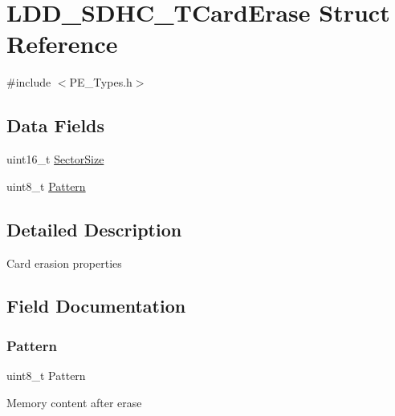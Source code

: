 \hypertarget{struct_l_d_d___s_d_h_c___t_card_erase}{}\section{L\+D\+D\+\_\+\+S\+D\+H\+C\+\_\+\+T\+Card\+Erase Struct Reference}
\label{struct_l_d_d___s_d_h_c___t_card_erase}


{\ttfamily \#include $<$P\+E\+\_\+\+Types.\+h$>$}

\subsection*{Data Fields}
\begin{DoxyCompactItemize}
\item 
uint16\+\_\+t \hyperlink{struct_l_d_d___s_d_h_c___t_card_erase_a7c1d58bafdd696b0d00c3f726d7bb66d}{Sector\+Size}
\item 
uint8\+\_\+t \hyperlink{struct_l_d_d___s_d_h_c___t_card_erase_a05f941c1dd525ef6b185d6ce2ebf69ca}{Pattern}
\end{DoxyCompactItemize}


\subsection{Detailed Description}
Card erasion properties 

\subsection{Field Documentation}
\mbox{\label{struct_l_d_d___s_d_h_c___t_card_erase_a05f941c1dd525ef6b185d6ce2ebf69ca}} 
\subsubsection{\texorpdfstring{Pattern}{Pattern}}
{\footnotesize\ttfamily uint8\+\_\+t Pattern}

Memory content after erase \mbox{\label{struct_l_d_d___s_d_h_c___t_card_erase_a7c1d58bafdd696b0d00c3f726d7bb66d}} 
